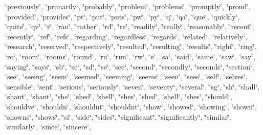 \char`\"{}previously\char`\"{}, \char`\"{}primarily\char`\"{}, \char`\"{}probably\char`\"{}, \char`\"{}problem\char`\"{}, \char`\"{}problems\char`\"{}, \char`\"{}promptly\char`\"{}, \char`\"{}proud\char`\"{}, \char`\"{}provided\char`\"{}, \char`\"{}provides\char`\"{}, \char`\"{}pt\char`\"{}, \char`\"{}put\char`\"{}, \char`\"{}puts\char`\"{}, \char`\"{}pw\char`\"{}, \char`\"{}py\char`\"{}, \char`\"{}q\char`\"{}, \char`\"{}qa\char`\"{}, \char`\"{}que\char`\"{}, \char`\"{}quickly\char`\"{}, \char`\"{}quite\char`\"{}, \char`\"{}qv\char`\"{}, \char`\"{}r\char`\"{}, \char`\"{}ran\char`\"{}, \char`\"{}rather\char`\"{}, \char`\"{}rd\char`\"{}, \char`\"{}re\char`\"{}, \char`\"{}readily\char`\"{}, \char`\"{}really\char`\"{}, \char`\"{}reasonably\char`\"{}, \char`\"{}recent\char`\"{}, \char`\"{}recently\char`\"{}, \char`\"{}ref\char`\"{}, \char`\"{}refs\char`\"{}, \char`\"{}regarding\char`\"{}, \char`\"{}regardless\char`\"{}, \char`\"{}regards\char`\"{}, \char`\"{}related\char`\"{}, \char`\"{}relatively\char`\"{}, \char`\"{}research\char`\"{}, \char`\"{}reserved\char`\"{}, \char`\"{}respectively\char`\"{}, \char`\"{}resulted\char`\"{}, \char`\"{}resulting\char`\"{}, \char`\"{}results\char`\"{}, \char`\"{}right\char`\"{}, \char`\"{}ring\char`\"{}, \char`\"{}ro\char`\"{}, \char`\"{}room\char`\"{}, \char`\"{}rooms\char`\"{}, \char`\"{}round\char`\"{}, \char`\"{}ru\char`\"{}, \char`\"{}run\char`\"{}, \char`\"{}rw\char`\"{}, \char`\"{}s\char`\"{}, \char`\"{}sa\char`\"{}, \char`\"{}said\char`\"{}, \char`\"{}same\char`\"{}, \char`\"{}saw\char`\"{}, \char`\"{}say\char`\"{}, \char`\"{}saying\char`\"{}, \char`\"{}says\char`\"{}, \char`\"{}sb\char`\"{}, \char`\"{}sc\char`\"{}, \char`\"{}sd\char`\"{}, \char`\"{}se\char`\"{}, \char`\"{}sec\char`\"{}, \char`\"{}second\char`\"{}, \char`\"{}secondly\char`\"{}, \char`\"{}seconds\char`\"{}, \char`\"{}section\char`\"{}, \char`\"{}see\char`\"{}, \char`\"{}seeing\char`\"{}, \char`\"{}seem\char`\"{}, \char`\"{}seemed\char`\"{}, \char`\"{}seeming\char`\"{}, \char`\"{}seems\char`\"{}, \char`\"{}seen\char`\"{}, \char`\"{}sees\char`\"{}, \char`\"{}self\char`\"{}, \char`\"{}selves\char`\"{}, \char`\"{}sensible\char`\"{}, \char`\"{}sent\char`\"{}, \char`\"{}serious\char`\"{}, \char`\"{}seriously\char`\"{}, \char`\"{}seven\char`\"{}, \char`\"{}seventy\char`\"{}, \char`\"{}several\char`\"{}, \char`\"{}sg\char`\"{}, \char`\"{}sh\char`\"{}, \char`\"{}shall\char`\"{}, \char`\"{}shan\textquotesingle{}t\char`\"{}, \char`\"{}shant\char`\"{}, \char`\"{}she\char`\"{}, \char`\"{}she\textquotesingle{}d\char`\"{}, \char`\"{}she\textquotesingle{}ll\char`\"{}, \char`\"{}she\textquotesingle{}s\char`\"{}, \char`\"{}shed\char`\"{}, \char`\"{}shell\char`\"{}, \char`\"{}shes\char`\"{}, \char`\"{}should\char`\"{}, \char`\"{}should\textquotesingle{}ve\char`\"{}, \char`\"{}shouldn\char`\"{}, \char`\"{}shouldn\textquotesingle{}t\char`\"{}, \char`\"{}shouldnt\char`\"{}, \char`\"{}show\char`\"{}, \char`\"{}showed\char`\"{}, \char`\"{}showing\char`\"{}, \char`\"{}shown\char`\"{}, \char`\"{}showns\char`\"{}, \char`\"{}shows\char`\"{}, \char`\"{}si\char`\"{}, \char`\"{}side\char`\"{}, \char`\"{}sides\char`\"{}, \char`\"{}significant\char`\"{}, \char`\"{}significantly\char`\"{}, \char`\"{}similar\char`\"{}, \char`\"{}similarly\char`\"{}, \char`\"{}since\char`\"{}, \char`\"{}sincere\char`\"{}, 